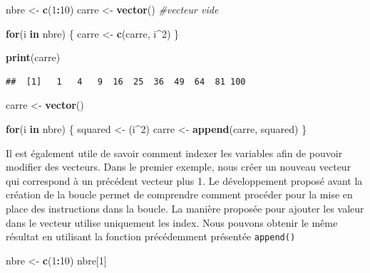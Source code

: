 \documentclass[
]{book}
\newenvironment{Shaded}{\begin{snugshade}}{\end{snugshade}}
\newcommand{\CommentTok}[1]{\textcolor[rgb]{0.56,0.35,0.01}{\textit{#1}}}
\newcommand{\ControlFlowTok}[1]{\textcolor[rgb]{0.13,0.29,0.53}{\textbf{#1}}}
\newcommand{\DecValTok}[1]{\textcolor[rgb]{0.00,0.00,0.81}{#1}}
\newcommand{\FunctionTok}[1]{\textcolor[rgb]{0.13,0.29,0.53}{\textbf{#1}}}
\newcommand{\NormalTok}[1]{#1}
\newcommand{\OtherTok}[1]{\textcolor[rgb]{0.56,0.35,0.01}{#1}}
\newcommand{\SpecialCharTok}[1]{\textcolor[rgb]{0.81,0.36,0.00}{\textbf{#1}}}
\begin{document}
\begin{Shaded}
\begin{Highlighting}[]
\NormalTok{nbre }\OtherTok{\textless{}{-}} \FunctionTok{c}\NormalTok{(}\DecValTok{1}\SpecialCharTok{:}\DecValTok{10}\NormalTok{)}
\NormalTok{carre }\OtherTok{\textless{}{-}} \FunctionTok{vector}\NormalTok{() }\CommentTok{\#vecteur vide }

\ControlFlowTok{for}\NormalTok{(i }\ControlFlowTok{in}\NormalTok{ nbre) \{}
\NormalTok{  carre }\OtherTok{\textless{}{-}} \FunctionTok{c}\NormalTok{(carre, i}\SpecialCharTok{\^{}}\DecValTok{2}\NormalTok{)  }
\NormalTok{\}}

\FunctionTok{print}\NormalTok{(carre)}
\end{Highlighting}
\end{Shaded}

\begin{verbatim}
##  [1]   1   4   9  16  25  36  49  64  81 100
\end{verbatim}

\begin{Shaded}
\begin{Highlighting}[]
\NormalTok{carre }\OtherTok{\textless{}{-}} \FunctionTok{vector}\NormalTok{()}

\ControlFlowTok{for}\NormalTok{(i }\ControlFlowTok{in}\NormalTok{ nbre) \{}
\NormalTok{  squared }\OtherTok{\textless{}{-}}\NormalTok{ (i}\SpecialCharTok{\^{}}\DecValTok{2}\NormalTok{)}
\NormalTok{  carre }\OtherTok{\textless{}{-}} \FunctionTok{append}\NormalTok{(carre, squared)  }
\NormalTok{\}}
\end{Highlighting}
\end{Shaded}

Il est également utile de savoir comment indexer les variables afin de pouvoir modifier des vecteurs. Dans le premier exemple, nous créer un nouveau vecteur qui correspond à un précédent vecteur plus 1. Le développement proposé avant la création de la boucle permet de comprendre comment procéder pour la mise en place des instructions dans la boucle. La manière proposée pour ajouter les valeur dans le vecteur utilise uniquement les index. Nous pouvons obtenir le même résultat en utilisant la fonction précédemment présentée \texttt{append()}

\begin{Shaded}
\begin{Highlighting}[]
\NormalTok{nbre }\OtherTok{\textless{}{-}} \FunctionTok{c}\NormalTok{(}\DecValTok{1}\SpecialCharTok{:}\DecValTok{10}\NormalTok{)}
\NormalTok{nbre[}\DecValTok{1}\NormalTok{]}
\end{Highlighting}
\end{Shaded}
\end{document}
